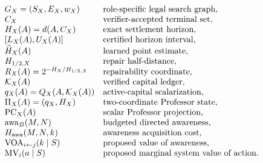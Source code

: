 \documentclass[11pt]{article}
\theoremstyle{definition}
\theoremstyle{remark}
\newcommand{\PC}{\operatorname{PC}}
\newcommand{\awa}{\operatorname{awa}}
\newcommand{\VOA}{\operatorname{VOA}}
\newcommand{\marg}{\operatorname{MV}}
\begin{document}
\[
\begin{array}{ll}
G_X=(S_X,E_X,w_X) & \text{role-specific legal search graph},\\
C_X & \text{verifier-accepted terminal set},\\
H_X(A)=d(A,C_X) & \text{exact settlement horizon},\\
{[L_X(A),U_X(A)]} & \text{certified horizon interval},\\
\widehat H_X(A) & \text{learned point estimate},\\
H_{1/2,X} & \text{repair half-distance},\\
R_X(A)=2^{-H_X/H_{1/2,X}} & \text{repairability coordinate},\\
\mathcal K_X(A) & \text{verified capital ledger},\\
q_X(A)=Q_X(A,\mathcal K_X(A)) & \text{active-capital scalarization},\\
\Pi_X(A)=(q_X,H_X) & \text{two-coordinate Professor state},\\
\PC_X(A) & \text{scalar Professor projection},\\
\awa_B(M,N) & \text{budgeted directed awareness},\\
H_{\rm awa}(M,N,k) & \text{awareness acquisition cost},\\
\VOA_{i\leftarrow j}(k\mid S) & \text{proposed value of awareness},\\
\marg_i(a\mid S) & \text{proposed marginal system value of action}.
\end{array}
\]
\end{document}
